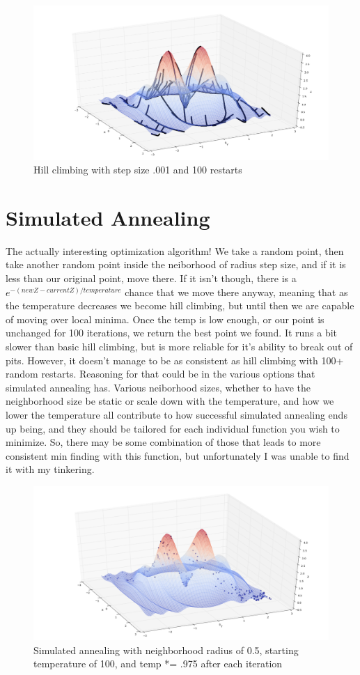 \documentclass{article}
\begin{document}
   \begin{figure}[h!]
      \includegraphics[width=\linewidth]{hill_climb_restarts.png}
      \caption{Hill climbing with step size .001 and 100 restarts}
      \label{fig:graph2}
   \end{figure}

   \section{Simulated Annealing}
   The actually interesting optimization algorithm! We take a random point, then take another random point inside the neiborhood of radius step size, and if it is less than our original point, move there. If it isn't though, there is a \(e^{-(newZ - currentZ) / temperature} \) chance that we move there anyway, meaning that as the temperature decreases we become hill climbing, but until then we are capable of moving over local minima. Once the temp is low enough, or our point is unchanged for 100 iterations, we return the best point we found. It runs a bit slower than basic hill climbing, but is more reliable for it's ability to break out of pits. However, it doesn't manage to be as consistent as hill climbing with 100+ random restarts. Reasoning for that could be in the various options that simulated annealing has. Various neiborhood sizes, whether to have the neighborhood size be static or scale down with the temperature, and  how we lower the temperature all contribute to how successful simulated annealing ends up being, and they should be tailored for each individual function you wish to minimize. So, there may be some combination of those that leads to more consistent min finding with this function, but unfortunately I was unable to find it with my tinkering.

   \begin{figure}[h!]
      \includegraphics[width=\linewidth]{simulated_annealing.png}
      \caption{Simulated annealing with neighborhood radius of 0.5, starting temperature of 100, and temp *= .975 after each iteration}
      \label{fig:graph1}
   \end{figure}
\end{document}
